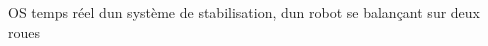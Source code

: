 OS temps réel d\textquotesingle{}un système de stabilisation, d\textquotesingle{}un robot se balançant sur deux roues 